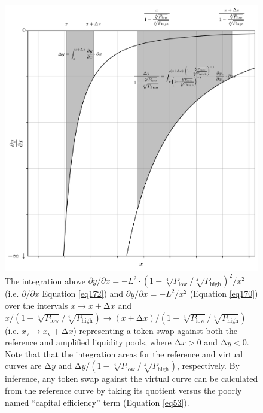 \documentclass{article}
\begin{document}
\begin{figure}[ht]
    \centering
    \includegraphics[width=\textwidth]{fig35.png}
    \captionsetup{
        justification=raggedright,
        singlelinecheck=false,
        font=small,
        labelfont=bf,
        labelsep=quad,
        format=plain
    }
    \caption{The integration above $\partial y / \partial x = - L^{2} \cdot \left( 1 - \sqrt[4]{P_{\text{low}}} / \sqrt[4]{P_{\text{high}}} \right)^{2} / x^{2}$ (i.e. $\partial / \partial x$ Equation \ref{eq172}) and $\partial y / \partial x = - L^{2} / x^{2}$ (Equation \ref{eq170}) over the intervals $x \rightarrow x + \mathrm{\Delta}x$ and $x / \left( 1 - \sqrt[4]{P_{\text{low}}} / \sqrt[4]{P_{\text{high}}} \right) \rightarrow \left(x + \mathrm{\Delta}x \right) / \left( 1 - \sqrt[4]{P_{\text{low}}} / \sqrt[4]{P_{\text{high}}} \right)$ (i.e. $x_{\text{v}} \rightarrow x_{\text{v}} + \mathrm{\Delta}x$) representing a token swap against both the reference and amplified liquidity pools, where $\mathrm{\Delta}x > 0$ and $\mathrm{\Delta}y < 0$. Note that that the integration areas for the reference and virtual curves are $\mathrm{\Delta}y$ and $\mathrm{\Delta}y / \left( 1 - \sqrt[4]{P_{\text{low}}} / \sqrt[4]{P_{\text{high}}} \right)$, respectively. By inference, any token swap against the virtual curve can be calculated from the reference curve by taking its quotient versus the poorly named “capital efficiency” term (Equation \ref{eq53}).}
    \label{fig35}
\end{figure}
\end{document}
